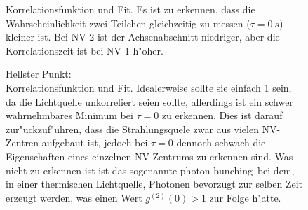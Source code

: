 \begin{figure}[htbp]
    \centering
    \begin{subfigure}{0.49\textwidth}
        \centering
        
        \label{fig:g12:1}
    \end{subfigure}
    \hfill
    \begin{subfigure}{0.49\textwidth}
        \centering
        
        \label{fig:g12:2}
    \end{subfigure}
    \caption{
        Korrelationsfunktion und Fit.
        Es ist zu erkennen, dass die Wahrscheinlichkeit zwei Teilchen gleichzeitig zu messen ($\tau=\SI{0}{s}$) kleiner ist.
        Bei NV 2 ist der Achsenabschnitt niedriger, aber die Korrelationszeit ist bei NV 1 h"oher.
    }
    \label{fig:g12}
\end{figure}

\begin{figure}[htbp]
    \centering
    
    \caption{
        Hellster Punkt:
        \\
        Korrelationsfunktion und Fit.
        Idealerweise sollte sie einfach 1 sein, da die Lichtquelle unkorreliert seien sollte, allerdings ist ein schwer wahrnehmbares Minimum bei $\tau=0$ zu erkennen.
        Dies ist darauf zur"uckzuf"uhren, dass die Strahlungsquele zwar aus vielen NV-Zentren aufgebaut ist, jedoch bei $\tau=0$ dennoch schwach die Eigenschaften eines einzelnen NV-Zentrums zu erkennen sind.
        Was nicht zu erkennen ist ist das sogenannte \glqq photon bunching\grqq\ bei dem, in einer thermischen Lichtquelle, Photonen bevorzugt zur selben Zeit erzeugt werden, was einen Wert $g^{(2)}(0)>1$ zur Folge h"atte.
    }
    \label{fig:g3}
\end{figure}
